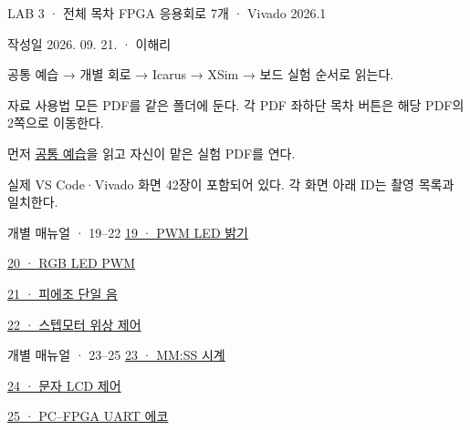 

\renewcommand{\small}{\fontsize{9}{11}\selectfont}
\begin{frame}{LAB 3 · 전체 목차}
\small
FPGA 응용회로 7개 · Vivado 2026.1\par\vspace{0.3cm}
작성일 2026. 09. 21. · 이해리\par\vspace{0.3cm}
공통 예습 → 개별 회로 → Icarus → XSim → 보드 실험 순서로 읽는다.
\end{frame}
\begin{frame}[label=lab3-contents]{자료 사용법}
\small
모든 PDF를 같은 폴더에 둔다. 각 PDF 좌하단 목차 버튼은 해당 PDF의 2쪽으로 이동한다.\par\vspace{0.3cm}
먼저 \href{06.LAB3_00_START.pdf}{공통 예습}을 읽고 자신이 맡은 실험 PDF를 연다.\par\vspace{0.3cm}
실제 VS Code·Vivado 화면 42장이 포함되어 있다. 각 화면 아래 ID는 촬영 목록과 일치한다.
\end{frame}
\begin{frame}{개별 매뉴얼 · 19–22}
\small
\href{06.LAB3_01_LED_PWM_VIVADO.pdf}{19 · PWM LED 밝기}\par\vspace{0.34cm}
\href{06.LAB3_02_RGB_PWM_VIVADO.pdf}{20 · RGB LED PWM}\par\vspace{0.34cm}
\href{06.LAB3_03_PIEZO_VIVADO.pdf}{21 · 피에조 단일 음}\par\vspace{0.34cm}
\href{06.LAB3_04_STEPPER_VIVADO.pdf}{22 · 스텝모터 위상 제어}\par\vspace{0.34cm}
\end{frame}
\begin{frame}{개별 매뉴얼 · 23–25}
\small
\href{06.LAB3_05_MMSS_CLOCK_VIVADO.pdf}{23 · MM:SS 시계}\par\vspace{0.34cm}
\href{06.LAB3_06_CHARACTER_LCD_VIVADO.pdf}{24 · 문자 LCD 제어}\par\vspace{0.34cm}
\href{06.LAB3_07_UART_ECHO_VIVADO.pdf}{25 · PC–FPGA UART 에코}\par\vspace{0.34cm}
\end{frame}


